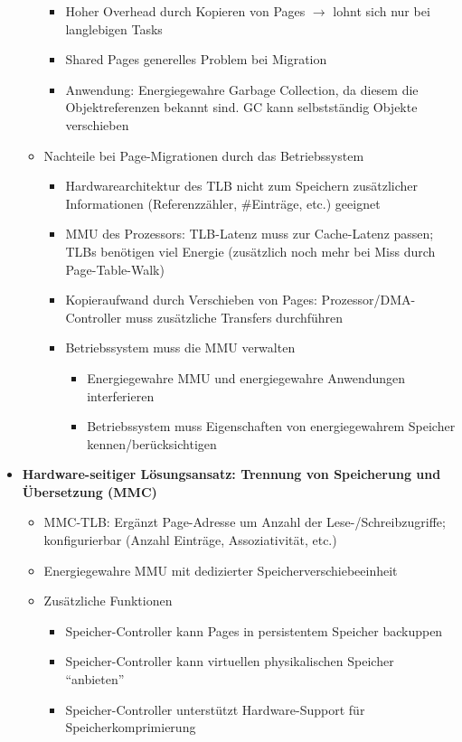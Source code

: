\begin{itemize}
\begin{itemize}
\begin{itemize}
			\item Hoher Overhead durch Kopieren von Pages \(\rightarrow\) lohnt sich nur bei langlebigen Tasks
			\item Shared Pages generelles Problem bei Migration
			\item Anwendung: Energiegewahre Garbage Collection, da diesem die Objektreferenzen bekannt sind. GC kann selbstständig Objekte verschieben
		\end{itemize}
		\item Nachteile bei Page-Migrationen durch das Betriebssystem
		\begin{itemize}
			\item Hardwarearchitektur des TLB nicht zum Speichern zusätzlicher Informationen (Referenzzähler, \#Einträge, etc.) geeignet
			\item MMU des Prozessors: TLB-Latenz muss zur Cache-Latenz passen; TLBs benötigen viel Energie (zusätzlich noch mehr bei Miss durch Page-Table-Walk)
			\item Kopieraufwand durch Verschieben von Pages: Prozessor/DMA-Controller muss zusätzliche Transfers durchführen
			\item Betriebssystem muss die MMU verwalten
			\begin{itemize}
				\item Energiegewahre MMU und energiegewahre Anwendungen interferieren
				\item Betriebssystem muss Eigenschaften von energiegewahrem Speicher kennen/berücksichtigen
			\end{itemize}
		\end{itemize}
	\end{itemize}
	\item \textbf{Hardware-seitiger Lösungsansatz: Trennung von Speicherung und Übersetzung (MMC)}
	\begin{itemize}
		\item MMC-TLB: Ergänzt Page-Adresse um Anzahl der Lese-/Schreibzugriffe; konfigurierbar (Anzahl Einträge, Assoziativität, etc.)
		\item Energiegewahre MMU mit dedizierter Speicherverschiebeeinheit
		\item Zusätzliche Funktionen
		\begin{itemize}
			\item Speicher-Controller kann Pages in persistentem Speicher backuppen
			\item Speicher-Controller kann virtuellen physikalischen Speicher "`anbieten"'
			\item Speicher-Controller unterstützt Hardware-Support für Speicherkomprimierung

\end{itemize}
\end{itemize}
\end{itemize}
